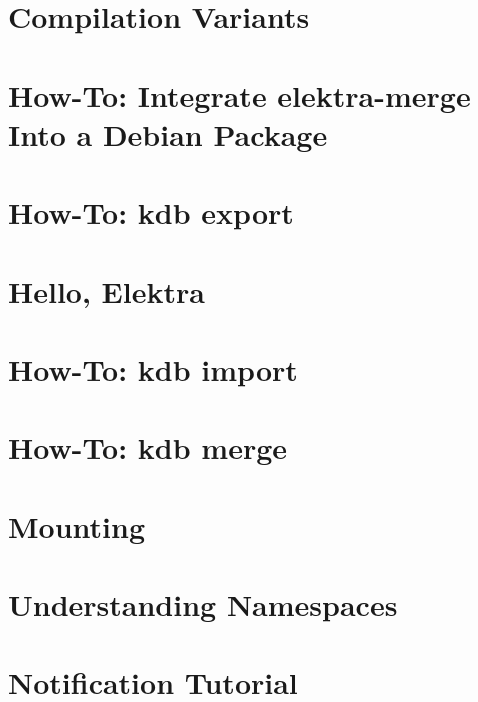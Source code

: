 \documentclass[twoside]{book}
\newcommand{\+}{\discretionary{\mbox{\scriptsize$\hookleftarrow$}}{}{}}
\begin{document}
\chapter{Compilation Variants}
\label{doc_tutorials_compilation-variants_md}

\chapter{How-\/\+To\+: Integrate elektra-\/merge Into a Debian Package}
\label{doc_tutorials_elektra-merge-integration_md}

\chapter{How-\/\+To\+: kdb export}
\label{doc_tutorials_export_md}

\chapter{Hello, Elektra}
\label{doc_tutorials_hello-elektra_md}

\chapter{How-\/\+To\+: kdb import}
\label{doc_tutorials_import_md}

\chapter{How-\/\+To\+: kdb merge}
\label{doc_tutorials_merge_md}

\chapter{Mounting}
\label{doc_tutorials_mount_md}

\chapter{Understanding Namespaces}
\label{doc_tutorials_namespaces_md}

\chapter{Notification Tutorial}
\label{doc_tutorials_notifications_md}

\end{document}
